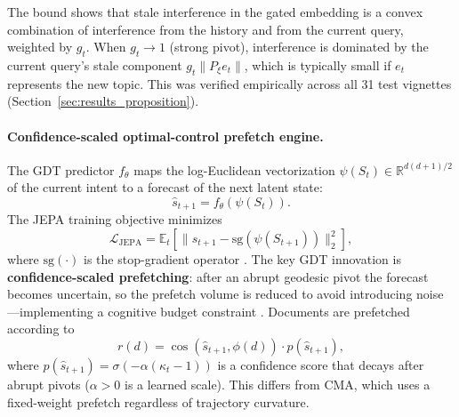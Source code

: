 \documentclass[11pt]{article}
\begin{document}
The bound shows that stale interference in the gated embedding is a convex combination of interference from the history and from the current query, weighted by $g_t$. When $g_t \to 1$ (strong pivot), interference is dominated by the current query's stale component $g_t\|P_\xi e_t\|$, which is typically small if $e_t$ represents the new topic. This was verified empirically across all 31 test vignettes (Section~\ref{sec:results_proposition}).

\paragraph{Confidence-scaled optimal-control prefetch engine.}
The GDT predictor $f_\theta$ maps the log-Euclidean vectorization $\psi(S_t) \in \mathbb{R}^{d(d+1)/2}$ of the current intent to a forecast of the next latent state:
\begin{equation}
  \hat{s}_{t+1} = f_\theta(\psi(S_t)).
  \label{eq:pred}
\end{equation}
The JEPA training objective minimizes
\begin{equation}
  \mathcal{L}_\mathrm{JEPA} = \mathbb{E}_t\!\left[\|\hat{s}_{t+1} - \mathrm{sg}(\psi(S_{t+1}))\|_2^2\right],
  \label{eq:jepa}
\end{equation}
where $\mathrm{sg}(\cdot)$ is the stop-gradient operator \citep{assran2023_ijepa,grill20}. The key GDT innovation is \textbf{confidence-scaled prefetching}: after an abrupt geodesic pivot the forecast becomes uncertain, so the prefetch volume is reduced to avoid introducing noise---implementing a cognitive budget constraint \citep{sweller1988_cogl}. Documents are prefetched according to
\begin{equation}
  r(d) = \cos(\hat{s}_{t+1}, \phi(d)) \cdot p(\hat{s}_{t+1}),
  \label{eq:prefetch}
\end{equation}
where $p(\hat{s}_{t+1}) = \sigma(-\alpha(\kappa_t - 1))$ is a confidence score that decays after abrupt pivots ($\alpha > 0$ is a learned scale). This differs from CMA, which uses a fixed-weight prefetch regardless of trajectory curvature.
\end{document}
